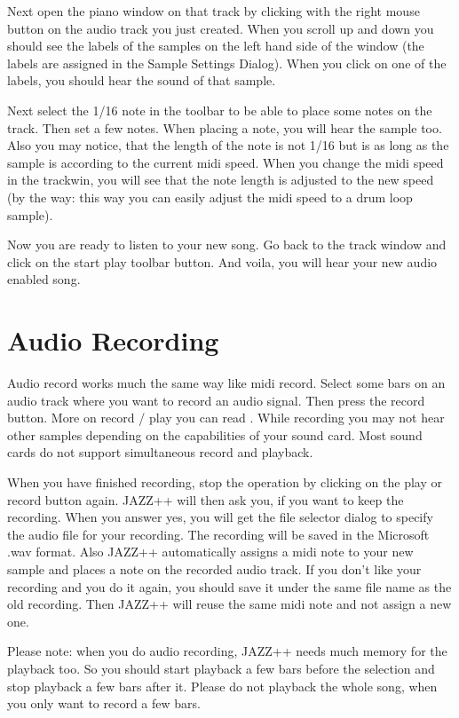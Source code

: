 \documentclass[letterpaper]{report}
\begin{document}
Next open the piano window on that track by clicking with the right
mouse button on the audio track you just created. When you scroll up
and down you should see the labels of the samples on the left hand side
of the window (the labels are assigned in the Sample Settings Dialog).
When you click on one of the labels, you should hear the sound of
that sample.

Next select the 1/16 note in the toolbar to be able to place some notes
on the track. Then set a few notes. When placing a note, you will hear
the sample too. Also you may notice, that the length of the note is
not 1/16 but is as long as the sample is according to the current midi
speed. When you change the midi speed in the trackwin, you will see that
the note length is adjusted to the new speed (by the way: this way you
can easily adjust the midi speed to a drum loop sample).

Now you are ready to listen to your new song. Go back to the track
window and click on the start play toolbar button. And voila, you will
hear your new audio enabled song.


\section{Audio Recording}

Audio record works much the same way like midi record. Select some bars
on an audio track where you want to record an audio signal. Then press
the record button. More on record / play you can read
.  While recording you may not hear other samples
depending on the capabilities of your sound card. Most sound cards do not
support simultaneous record and playback.

When you have finished recording, stop the operation by clicking on the
play or record button again. JAZZ++ will then ask you, if you want to
keep the recording.  When you answer yes, you will get the file selector
dialog to specify the audio file for your recording. The recording will
be saved in the Microsoft .wav format.  Also JAZZ++ automatically assigns
a midi note to your new sample and places a note on the recorded audio
track.  If you don't like your recording and you do it again, you should
save it under the same file name as the old recording. Then JAZZ++ will
reuse the same midi note and not assign a new one.

Please note: when you do audio recording, JAZZ++ needs much memory for the
playback too. So you should start playback a few bars before the
selection and stop playback a few bars after it. Please do not playback
the whole song, when you only want to record a few bars.
\end{document}
